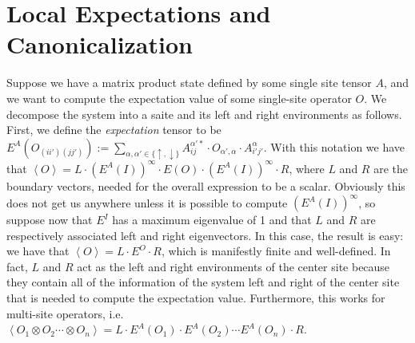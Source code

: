\documentclass{article}
\newcommand{\paren}[1]{\left(#1\right)}
\newcommand{\seq}[1]{\left<#1\right>}
\newcommand{\tr}{\text{\textbf{tr}}\,}
\newcommand{\expect}[1]{\left<#1\right>}
\begin{document}
\begin{comment}
Fortunately, in practice we don't actually need or even want the full wave function, only its expectation value with respect to various operators.  For example, assume that we are working with qubits\footnote{All of the results presented generalize for arbitrary qudits, but we choose to work with qubits specifically for concreteness and to keep things simple.} and let $Z$ be the Pauli Z spin matrix;  then the expectation with respect to $Z$ at site 0 is equal to
$$\sum_{\seq{\alpha_i}}\sum_{\alpha'_0\in\{\uparrow,\downarrow\}}\psi\paren{\seq{\alpha_i}}\cdot\psi^*\paren{\seq{\begin{cases}\alpha_0' & i=0 \\ \alpha_i & \text{otherwise}\end{cases}}}\cdot Z_{\alpha_0\alpha'_0}=\tr(M\cdot Z),$$ where $$M_{\alpha_0\alpha'_0}=\sum_{\seq{\alpha_i}_{i\ne 0}}\psi\paren{\seq{\alpha_i}}\cdot\psi^*\paren{\seq{\begin{cases}\alpha_0' & i=0 \\ \alpha_i & \text{otherwise}\end{cases}}},$$
which traces over all the observables except the one at site zero to form the matrix $M$, which we call the \emph{environment} tensor because it contains the information from the rest of the system.  This notion of rewriting into a dot product between a matrix that encodes the \emph{environment} of a given site and a matrix that represents the expectation of a 1-site operator at that site is a very powerful one because it gives us a way to work with infinite systems.
\end{comment}

\section{Local Expectations and Canonicalization}

Suppose we have a matrix product state defined by some single site tensor $A$, and we want to compute the expectation value of some single-site operator $O$.  We decompose the system into a saite and its left and right environments as follows.  First, we define the \emph{expectation} tensor to be $E^A(O_{(ii')(jj')}):=\sum_{\alpha,\alpha'\in\{\uparrow,\downarrow\}}A^{\alpha'*}_{ij}\cdot O_{\alpha',\alpha}\cdot A^\alpha_{i'j'}.$  With this notation we have that $\expect{O}=L\cdot (E^A(I))^\infty\cdot E(O)\cdot(E^A(I))^\infty\cdot R$, where $L$ and $R$ are the boundary vectors, needed for the overall expression to be a scalar.  Obviously this does not get us anywhere unless it is possible to compute $(E^A(I))^\infty$, so suppose now that $E^I$ has a maximum eigenvalue of 1 and that $L$ and $R$ are respectively associated left and right eigenvectors.  In this case, the result is easy:  we have that $\expect{O}=L\cdot E^O\cdot R$, which is manifestly finite and well-defined.  In fact, $L$ and $R$ act as the left and right environments of the center site because they contain all of the information of the system left and right of the center site that is needed to compute the expectation value.  Furthermore, this works for multi-site operators, i.e. $\expect{O_1\otimes O_2\cdots\otimes O_n} = L\cdot E^A(O_1)\cdot E^A(O_2)\cdots E^A(O_n)\cdot R$.
\end{document}

